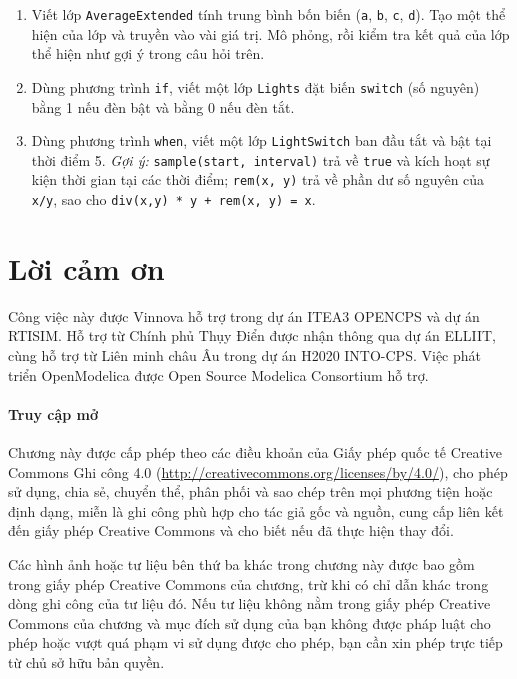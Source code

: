 \begin{enumerate}
\begin{verbatim}
  instanceVariable.classVariable.
\end{verbatim}
\item Viết lớp \texttt{AverageExtended} tính trung bình bốn biến (\texttt{a}, \texttt{b}, \texttt{c}, \texttt{d}). Tạo một thể hiện của lớp và truyền vào vài giá trị. Mô phỏng, rồi kiểm tra kết quả của lớp thể hiện như gợi ý trong câu hỏi trên.
\item Dùng phương trình \texttt{if}, viết một lớp \texttt{Lights} đặt biến \texttt{switch} (số nguyên) bằng 1 nếu đèn bật và bằng 0 nếu đèn tắt.
\item Dùng phương trình \texttt{when}, viết một lớp \texttt{LightSwitch} ban đầu tắt và bật tại thời điểm 5. \emph{Gợi ý:} \texttt{sample(start, interval)} trả về \texttt{true} và kích hoạt sự kiện thời gian tại các thời điểm; \texttt{rem(x, y)} trả về phần dư số nguyên của \texttt{x/y}, sao cho \texttt{div(x,y) * y + rem(x, y) = x}.
\end{enumerate}

\section*{Lời cảm ơn}
Công việc này được Vinnova hỗ trợ trong dự án ITEA3 OPENCPS và dự án RTISIM. Hỗ trợ từ Chính phủ Thụy Điển được nhận thông qua dự án ELLIIT, cùng hỗ trợ từ Liên minh châu Âu trong dự án H2020 INTO-CPS. Việc phát triển OpenModelica được Open Source Modelica Consortium hỗ trợ.

\paragraph*{Truy cập mở}
Chương này được cấp phép theo các điều khoản của Giấy phép quốc tế Creative Commons Ghi công 4.0 (\url{http://creativecommons.org/licenses/by/4.0/}), cho phép sử dụng, chia sẻ, chuyển thể, phân phối và sao chép trên mọi phương tiện hoặc định dạng, miễn là ghi công phù hợp cho tác giả gốc và nguồn, cung cấp liên kết đến giấy phép Creative Commons và cho biết nếu đã thực hiện thay đổi.

Các hình ảnh hoặc tư liệu bên thứ ba khác trong chương này được bao gồm trong giấy phép Creative Commons của chương, trừ khi có chỉ dẫn khác trong dòng ghi công của tư liệu đó. Nếu tư liệu không nằm trong giấy phép Creative Commons của chương và mục đích sử dụng của bạn không được pháp luật cho phép hoặc vượt quá phạm vi sử dụng được cho phép, bạn cần xin phép trực tiếp từ chủ sở hữu bản quyền.
